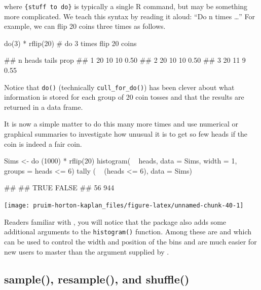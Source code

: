 \noindent
where \texttt{\{stuff\ to\ do\}} is typically a single R command, but
may be something more complicated. We teach this syntax by reading it
aloud: ``Do n times \ldots{}'' For example, we can flip 20 coins three
times as follows.

\begin{Schunk}
\begin{Sinput}
do(3) * rflip(20)   # do 3 times flip 20 coins
\end{Sinput}
\begin{Soutput}
##    n heads tails prop
## 1 20    10    10 0.50
## 2 20    10    10 0.50
## 3 20    11     9 0.55
\end{Soutput}
\end{Schunk}

\noindent
Notice that \texttt{do()} (technically \texttt{cull\_for\_do()}) has
been clever about what information is stored for each group of 20 coin
tosses and that the results are returned in a data frame.

It is now a simple matter to do this many more times and use numerical
or graphical summaries to investigate how unusual it is to get so few
heads if the coin is indeed a fair coin.

\begin{Schunk}
\begin{Sinput}
Sims <- do (1000) * rflip(20)
histogram( ~ heads, data = Sims, width = 1, groups = heads <= 6)
tally ( ~ (heads <= 6), data = Sims)
\end{Sinput}
\begin{Soutput}
## 
##  TRUE FALSE 
##    56   944
\end{Soutput}


\begin{center}\texttt{[image: pruim-horton-kaplan\_files/figure-latex/unnamed-chunk-40-1]} \end{center}

\end{Schunk}

\noindent
Readers familiar with , you will notice that the
 package also adds some additional arguments to the
\texttt{histogram()} function. Among these are  and
 which can be used to control the width and position of the
bins and are much easier for new users to master than the 
argument supplied by .

\subsection{sample(), resample(), and
shuffle()}\label{sample-resample-and-shuffle}

